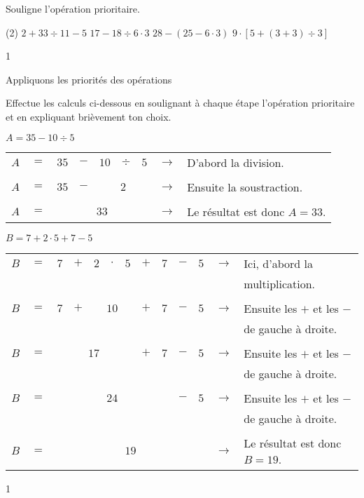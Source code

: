 \documentclass[a4paper,11pt]{report}
\begin{document}
\begin{exop}{
Souligne l'opération prioritaire.
\begin{tasks}(2)
\task $2+33\div  11-5$
\task $17-18\div 6\cdot3$
\task $28-(25-6\cdot3)$
\task $9\cdot\left[5+(3+3)\div  3\right]$
\end{tasks}
}{1}\end{exop}

\newpage

\begin{resolu}{Appliquons les priorités des opérations}
{
Effectue les calculs ci-dessous en soulignant à chaque étape l'opération prioritaire et en expliquant brièvement ton choix.
\begin{tasks}
\task $A=35-10\div 5$

{\color{blue}
\begin{center}
\begin{tabular}{|ccccccc|cp{7.7cm}|}\hline
$A$&$=$&$35$&$-$&$10$&$ \div $& $5$ & $\rightarrow$ & D'abord la division.\\\cline{5-7}
&&&&&&&&\\
$A$&$=$&$35$&$-$&\multicolumn{3}{c|}{$2$} & $\rightarrow$ & Ensuite la soustraction.\\\cline{3-6}
&&&&&&&&\\
$A$&$=$&\multicolumn{5}{c|}{$33$} & $\rightarrow$ & Le résultat est donc $A=33$.\\\hline
\end{tabular}
\end{center}}
\task $B=7+2\cdot 5+7-5$

{\color{blue}
\begin{center}
\begin{tabular}{|ccccccccccc|cp{5cm}|}\hline
$B$&$=$&$7$&$+$&$2$&$\cdot$&$5$&$+$&$7$&$-$&$5$&$\rightarrow$& Ici, d'abord la \\\cline{5-7}
& & & & & & & & & & & & multiplication.\\
&&&&&&&&&&&&\\
$B$&$=$&$7$&$+$&\multicolumn{3}{c}{$10$}&$+$&$7$&$-$&$5$&$\rightarrow$& Ensuite les $+$ et les $-$\\\cline{3-6}
& & & & & & & & & & & &  de gauche à droite.\\
&&&&&&&&&&&&\\
$B$&$=$&\multicolumn{5}{c}{$17$}&$+$&$7$&$-$&$5$&$\rightarrow$& Ensuite les $+$ et les $-$\\\cline{5-9}
& & & & & & & & & & & & de gauche à droite.\\
&&&&&&&&&&&&\\
$B$&$=$&\multicolumn{7}{c}{$24$}&$-$&$5$&$\rightarrow$& Ensuite les $+$ et les $-$\\\cline{6-11}
& & & & & & & & & & & & de gauche à droite.\\
&&&&&&&&&&&&\\
$B$&$=$&\multicolumn{9}{c|}{$19$}&$\rightarrow$& Le résultat est donc $B=19$.\\\hline
\end{tabular}
\end{center}}
\end{tasks}}{1}
\end{resolu}
\end{document}
